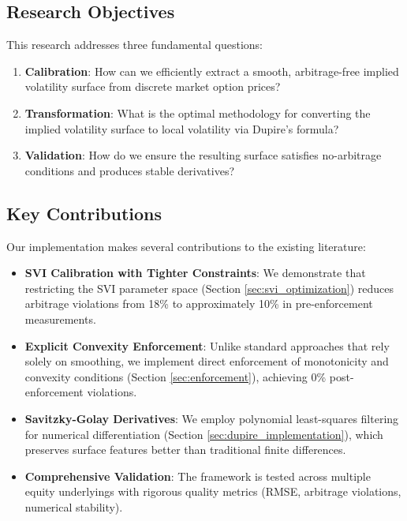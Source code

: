\documentclass[12pt,a4paper]{article}
\begin{document}
\subsection{Research Objectives}

This research addresses three fundamental questions:

\begin{enumerate}
    \item \textbf{Calibration}: How can we efficiently extract a smooth, arbitrage-free implied volatility surface from discrete market option prices?
    \item \textbf{Transformation}: What is the optimal methodology for converting the implied volatility surface to local volatility via Dupire's formula?
    \item \textbf{Validation}: How do we ensure the resulting surface satisfies no-arbitrage conditions and produces stable derivatives?
\end{enumerate}

\subsection{Key Contributions}

Our implementation makes several contributions to the existing literature:

\begin{itemize}
    \item \textbf{SVI Calibration with Tighter Constraints}: We demonstrate that restricting the SVI parameter space (Section \ref{sec:svi_optimization}) reduces arbitrage violations from 18\% to approximately 10\% in pre-enforcement measurements.
    
    \item \textbf{Explicit Convexity Enforcement}: Unlike standard approaches that rely solely on smoothing, we implement direct enforcement of monotonicity and convexity conditions (Section \ref{sec:enforcement}), achieving 0\% post-enforcement violations.
    
    \item \textbf{Savitzky-Golay Derivatives}: We employ polynomial least-squares filtering for numerical differentiation (Section \ref{sec:dupire_implementation}), which preserves surface features better than traditional finite differences.
    
    \item \textbf{Comprehensive Validation}: The framework is tested across multiple equity underlyings with rigorous quality metrics (RMSE, arbitrage violations, numerical stability).
\end{itemize}
\end{document}
